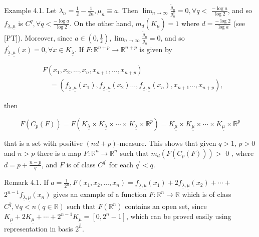 \documentclass[10pt]{article}
\begin{document}
Example 4.1. Let $\lambda_{n}=\frac{1}{2}-\frac{1}{2 n}, \mu_{n} \equiv a$. Then $\lim _{n \rightarrow \infty} \frac{\tilde{g}_{n}}{g_{n}^{q}}=0, \forall q<$ $\frac{-\log a}{\log 2}$, and so $f_{\underline{\lambda}, \underline{\mu}}$ is $C^{q}, \forall q<\frac{-\log a}{\log 2}$. On the other hand, $m_{d}\left(K_{\underline{\mu}}\right)=1$ where $d=\frac{-\log 2}{\log a}$ (see [PT]). Moreover, since $a \in\left(0, \frac{1}{2}\right), \lim _{n \rightarrow \infty} \frac{\tilde{g}_{n}}{g_{n}}=0$, and so $f_{\underline{\lambda}, \underline{\mu}}^{\prime}(x)=0, \forall x \in K_{\underline{\lambda}}$. If $F: \mathbb{R}^{n+p} \rightarrow \mathbb{R}^{n+p}$ is given by

$$
\begin{aligned}
& F\left(x_{1}, x_{2}, \ldots, x_{n}, x_{n+1}, \ldots, x_{n+p}\right) \\
& \quad=\left(f_{\underline{\lambda}, \underline{\mu}}\left(x_{1}\right), f_{\underline{\lambda}, \underline{\mu}}\left(x_{2}\right) \ldots, f_{\underline{\lambda}, \underline{\mu}}\left(x_{n}\right), x_{n+1} \ldots, x_{n+p}\right),
\end{aligned}
$$

then

$$
F\left(C_{p}(F)\right)=F\left(K_{\underline{\lambda}} \times K_{\underline{\lambda}} \times \cdots \times K_{\underline{\lambda}} \times \mathbb{R}^{p}\right)=K_{\underline{\mu}} \times K_{\underline{\mu}} \times \cdots \times K_{\underline{\mu}} \times \mathbb{R}^{p}
$$

that is a set with positive $(n d+p)$-measure. This shows that given $q>1$, $p>0$ and $n>p$ there is a map $F: \mathbb{R}^{n} \rightarrow \mathbb{R}^{n}$ such that $m_{d}\left(F\left(C_{p}(F)\right)\right)>$ 0 , where $d=p+\frac{n-p}{q}$, and $F$ is of class $C^{q^{\prime}}$ for each $q^{\prime}<q$.

Remark 4.1. If $a=\frac{1}{2^{n}}, F\left(x_{1}, x_{2}, \ldots, x_{n}\right)=f_{\underline{\lambda}, \underline{\mu}}\left(x_{1}\right)+2 f_{\underline{\lambda}, \underline{\mu}}\left(x_{2}\right)+\cdots+$ $2^{n-1} f_{\underline{\lambda}, \underline{\mu}}\left(x_{n}\right)$ gives an example of a function $F: \mathbb{R}^{n} \rightarrow \mathbb{R}$ which is of class $C^{\bar{q}}, \forall q<n(q \in \mathbb{R})$ such that $F\left(\mathbb{R}^{n}\right)$ contains an open set, since $K_{\underline{\mu}}+2 K_{\underline{\mu}}+\cdots+2^{n-1} K_{\underline{\mu}}=\left[0,2^{n}-1\right]$, which can be proved easily using representation in basis $2^{\bar{n}}$.
\end{document}
